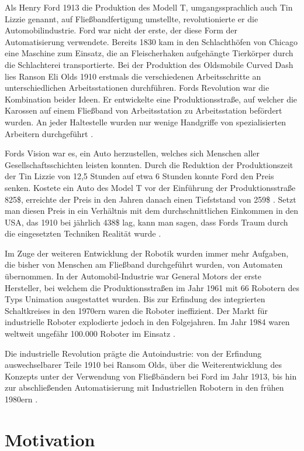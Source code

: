 \documentclass[12pt,oneside,a4paper,parskip]{scrbook}
\begin{document}
Als Henry Ford 1913 die Produktion des Modell T, umgangssprachlich auch Tin Lizzie genannt, auf Fließbandfertigung umstellte, revolutionierte er die Automobilindustrie. Ford war nicht der erste, der diese Form der Automatisierung verwendete. Bereits 1830 kam in den Schlachthöfen von Chicago eine Maschine zum Einsatz, die an Fleischerhaken aufgehängte Tierkörper durch die Schlachterei transportierte. Bei der Produktion des Oldsmobile Curved Dash lies Ranson Eli Olds 1910 erstmals die verschiedenen Arbeitsschritte an unterschiedlichen Arbeitsstationen durchführen. Fords Revolution war die Kombination beider Ideen. Er entwickelte eine Produktionsstraße, auf welcher die Karossen auf einem Fließband von Arbeitsstation zu Arbeitsstation befördert wurden. An jeder Haltestelle wurden nur wenige Handgriffe von spezialisierten Arbeitern durchgeführt \cite{sagerso2008}.

Fords Vision war es, ein Auto herzustellen, welches sich Menschen aller Gesellschaftsschichten leisten konnten. Durch die Reduktion der Produktionszeit der Tin Lizzie von 12,5 Stunden auf etwa 6 Stunden konnte Ford den Preis senken. Kostete ein Auto des Model T vor der Einführung der Produktionsstraße 825\$, erreichte der Preis in den Jahren danach einen Tiefststand von 259\$ \cite{reichlesz2010}. Setzt man diesen Preis in ein Verhältnis mit dem durchschnittlichen Einkommen in den USA, das 1910 bei jährlich 438\$ lag, kann man sagen, dass Fords Traum durch die eingesetzten Techniken Realität wurde \cite{usembassyodnumbers}.

Im Zuge der weiteren Entwicklung der Robotik wurden immer mehr Aufgaben, die bisher von Menschen am Fließband durchgeführt wurden, von Automaten übernommen. In der Automobil-Industrie war General Motors der erste Hersteller, bei welchem die Produktionsstraßen im Jahr 1961 mit 66 Robotern des Typs Unimation ausgestattet wurden. Bis zur Erfindung des integrierten Schaltkreises in den 1970ern waren die Roboter ineffizient. Der Markt für industrielle Roboter explodierte jedoch in den Folgejahren. Im Jahr 1984 waren weltweit ungefähr 100.000 Roboter im Einsatz \cite{czaeis2000, wallen2008}.

Die industrielle Revolution prägte die Autoindustrie: von der Erfindung auswechselbarer Teile 1910 bei Ransom Olds, über die Weiterentwicklung des Konzepts unter der Verwendung von Fließbändern bei Ford im Jahr 1913, bis hin zur abschließenden Automatisierung mit Industriellen Robotern in den frühen 1980ern \cite{czaeis2000}.

\section{Motivation}
\end{document}
